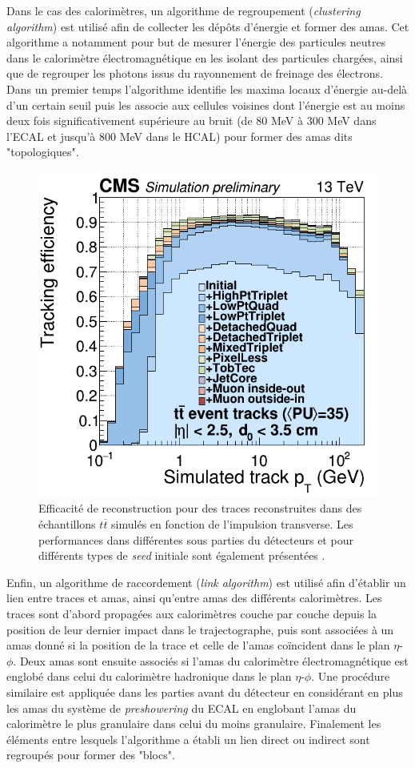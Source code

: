 Dans le cas des calorimètres, un algorithme de regroupement (\textit{clustering algorithm}) est utilisé afin de collecter les dépôts d'énergie et former des amas. Cet algorithme a notamment pour but de mesurer l'énergie des particules neutres dans le calorimètre électromagnétique en les isolant des particules chargées, ainsi que de regrouper les photons issus du rayonnement de freinage des électrons. Dans un premier temps l'algorithme identifie les maxima locaux d'énergie au-delà d'un certain seuil puis les associe aux cellules voisines dont l'énergie est au moins deux fois significativement supérieure au bruit (de $80$ MeV à $300$ MeV dans l'ECAL et jusqu'à 800 MeV dans le HCAL) pour former des amas dits "topologiques". \\

\begin{figure}[!ht]
\centering
    \includegraphics[width=0.55\linewidth]{Chapitre4/Images/MC_eff.png} 
    \caption{Efficacité de reconstruction pour des traces reconstruites dans des échantillons $t\overline{t}$ simulés en fonction de l'impulsion transverse. Les performances dans différentes sous parties du détecteurs et pour différents types de \textit{seed} initiale sont également présentées \cite{Elmetenawee:2020emw}.}
    \label{pttrackefficiency}
\end{figure} 

Enfin, un algorithme de raccordement (\textit{link algorithm}) est utilisé afin d'établir un lien entre traces et amas, ainsi qu'entre amas des différents calorimètres. Les traces sont d'abord propagées aux calorimètres couche par couche depuis la position de leur dernier impact dans le trajectographe, puis sont associées à un amas donné si la position de la trace et celle de l'amas coïncident dans le plan $\eta$-$\phi$. Deux amas sont ensuite associés si l'amas du calorimètre électromagnétique est englobé dans celui du calorimètre hadronique dans le plan $\eta$-$\phi$. Une procédure similaire est appliquée dans les parties avant du détecteur en considérant en plus les amas du système de \textit{preshowering} du ECAL en englobant l'amas du calorimètre le plus granulaire dans celui du moins granulaire. Finalement les éléments entre lesquels l'algorithme a établi un lien direct ou indirect sont regroupés pour former des "blocs".

